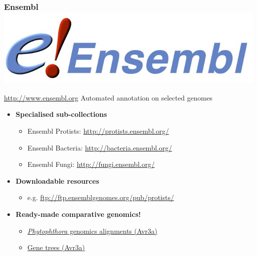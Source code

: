 \begin{frame}
  \frametitle{Ensembl \hfill \includegraphics[height=0.1\textheight,valign=t]{images/ensembl_metazoa_logo}}
    \begin{alertblock}{\href{http://www.ensembl.org}{http://www.ensembl.org}}
      Automated annotation on selected genomes
    \end{alertblock}
    \begin{itemize}
      \item \textcolor{hutton_green}{\textbf{Specialised sub-collections}}
      \begin{itemize}
        \item Ensembl Protists: \textcolor{hutton_purple}{\href{http://protists.ensembl.org/}{http://protists.ensembl.org/}}
        \item Ensembl Bacteria: \textcolor{hutton_purple}{\href{http://bacteria.ensembl.org/}{http://bacteria.ensembl.org/}}
        \item Ensembl Fungi: \textcolor{hutton_purple}{\href{http://fungi.ensembl.org/}{http://fungi.ensembl.org/}}
      \end{itemize}
      \item \textcolor{hutton_blue}{\textbf{Downloadable resources}}
      \begin{itemize}
        \item e.g. \textcolor{hutton_purple}{\href{http://ftp.ensemblgenomes.org/pub/protists/}{ftp://ftp.ensemblgenomes.org/pub/protists/}}
      \end{itemize}
      \item \textcolor{RawSienna}{\textbf{Ready-made comparative genomics!}}
      \begin{itemize}
        \item \textcolor{hutton_purple}{\href{http://protists.ensembl.org/Phytophthora_infestans/Location/Compara_Alignments/Image?align=119329;db=core;r=supercont1.34:559462-573700}{\textit{Phytophthora} genomics alignments (Avr3a)}}
        \item \textcolor{hutton_purple}{\href{http://protists.ensembl.org/Phytophthora_infestans/Gene/Compara_Tree/pan_compara?db=core;g=PITG_14371;r=supercont1.34:559462-573700;t=PITG_14371T0}{Gene trees (Avr3a)}}
      \end{itemize}
    \end{itemize}
\end{frame}

